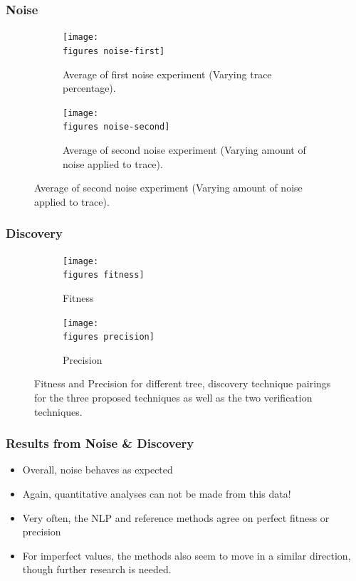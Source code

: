 \documentclass{beamer}
\newcommand{\figures}{../figures/}
\begin{document}
	\begin{frame}
		\frametitle{Noise}
		\begin{figure}
			\centering
			\begin{subfigure}[b]{0.49\textwidth}
				\centering
				\texttt{[image: \\figures noise-first]}
				\caption{Average of first noise experiment (Varying trace percentage).}
				\label{fig:noise-first}
			\end{subfigure}
			\hfill
			\begin{subfigure}[b]{0.49\textwidth}
				\centering
				\texttt{[image: \\figures noise-second]}
				\caption{Average of second noise experiment (Varying amount of noise applied to trace).}
				\label{fig:noise-second}
			\end{subfigure}
		\end{figure}
	\end{frame}
	
	
	\begin{frame}
		\frametitle{Discovery}
		\begin{figure}
			\centering
			\begin{subfigure}[b]{0.49\textwidth}
				\centering
				\texttt{[image: \\figures fitness]}
				\caption{Fitness}
				\label{fig:fitness}
			\end{subfigure}
			\hfill
			\begin{subfigure}[b]{0.49\textwidth}
				\centering
				\texttt{[image: \\figures precision]}
				\caption{Precision}
				\label{fig:precision}
			\end{subfigure}
			\caption{Fitness and Precision for different tree, discovery technique pairings for the three proposed techniques as well as the two verification techniques.}
			\label{fig:discovery}
		\end{figure}
	\end{frame}
	
	\begin{frame}
		\frametitle{Results from Noise \& Discovery}
		\begin{itemize}
			\item Overall, noise behaves as expected
			\item Again, quantitative analyses can not be made from this data!
			\item Very often, the NLP and reference methods agree on perfect fitness or precision
			\item For imperfect values, the methods also seem to move in a similar direction, though further research is needed.
		\end{itemize}
	\end{frame}
	
\end{document}
